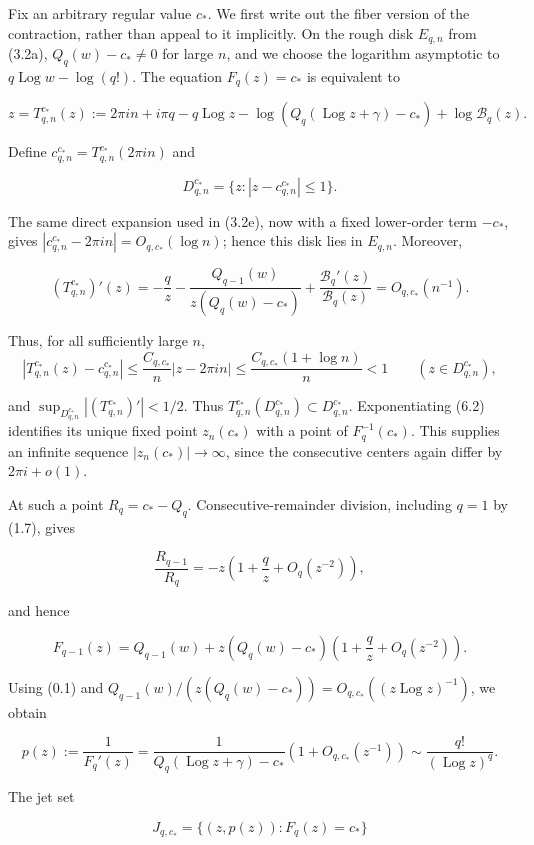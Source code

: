 \documentclass[11pt]{article}
\DeclareMathOperator{\Log}{Log}
\theoremstyle{keio}
\theoremstyle{definition}
\theoremstyle{remark}
\begin{document}
Fix an arbitrary regular value \(c_*\). We first write out the fiber version of the
contraction, rather than appeal to it implicitly. On the rough disk
\(E_{q,n}\) from (3.2a), \(Q_q(w)-c_*\ne0\) for large \(n\), and we choose
the logarithm asymptotic to \(q\Log w-\log(q!)\). The equation
\(F_q(z)=c_*\) is equivalent to

\[
 z=T^{c_*}_{q,n}(z):=2\pi in+i\pi q-q\Log z
 -\log(Q_q(\Log z+\gamma)-c_*)+\log\mathcal B_q(z).
\tag{Inv-6.2}
\]

Define \(c^{c_*}_{q,n}=T^{c_*}_{q,n}(2\pi in)\) and

\[
 D^{c_*}_{q,n}=\{z:|z-c^{c_*}_{q,n}|\leq1\}.
\]

The same direct expansion used in (3.2e), now with a fixed lower-order term
\(-c_*\), gives
\(|c^{c_*}_{q,n}-2\pi in|=O_{q,c_*}(\log n)\); hence this disk lies in
\(E_{q,n}\). Moreover,

\[
 (T^{c_*}_{q,n})'(z)
 =-\frac qz-
 \frac{Q_{q-1}(w)}{z(Q_q(w)-c_*)}
 +\frac{\mathcal B_q'(z)}{\mathcal B_q(z)}
 =O_{q,c_*}(n^{-1}).
\tag{Inv-6.3}
\]

Thus, for all sufficiently large \(n\),
\[
 |T^{c_*}_{q,n}(z)-c^{c_*}_{q,n}|
 \leq \frac{C_{q,c_*}}n|z-2\pi in|
 \leq \frac{C_{q,c_*}(1+\log n)}n<1
 \qquad(z\in D^{c_*}_{q,n}),
\]

and \(\sup_{D^{c_*}_{q,n}}|(T^{c_*}_{q,n})'|<1/2\). Thus
\(T^{c_*}_{q,n}(D^{c_*}_{q,n})\subset D^{c_*}_{q,n}\).
Exponentiating (6.2) identifies its unique
fixed point \(z_n(c_*)\) with a point of \(F_q^{-1}(c_*)\). This supplies
an infinite sequence \(|z_n(c_*)|\to\infty\), since the consecutive centers
again differ by \(2\pi i+o(1)\).

At such a point \(R_q=c_*-Q_q\). Consecutive-remainder division, including
\(q=1\) by (1.7), gives

\[
 \frac{R_{q-1}}{R_q}
 =-z\left(1+\frac qz+O_q(z^{-2})\right),
\]

and hence

\[
 F_{q-1}(z)=Q_{q-1}(w)
 +z(Q_q(w)-c_*)\left(1+\frac qz+O_q(z^{-2})\right).
\tag{Inv-6.4}
\]

Using (0.1) and
\(Q_{q-1}(w)/(z(Q_q(w)-c_*))=O_{q,c_*}((z\Log z)^{-1})\), we obtain

\[
 p(z):=\frac1{F_q'(z)}
 =\frac1{Q_q(\Log z+\gamma)-c_*}
  \left(1+O_{q,c_*}(z^{-1})\right)
 \sim\frac{q!}{(\Log z)^q}.
\tag{Inv-6.5}
\]

The jet set

\[
 J_{q,c_*}=\{(z,p(z)):F_q(z)=c_*\}
\]
\end{document}

